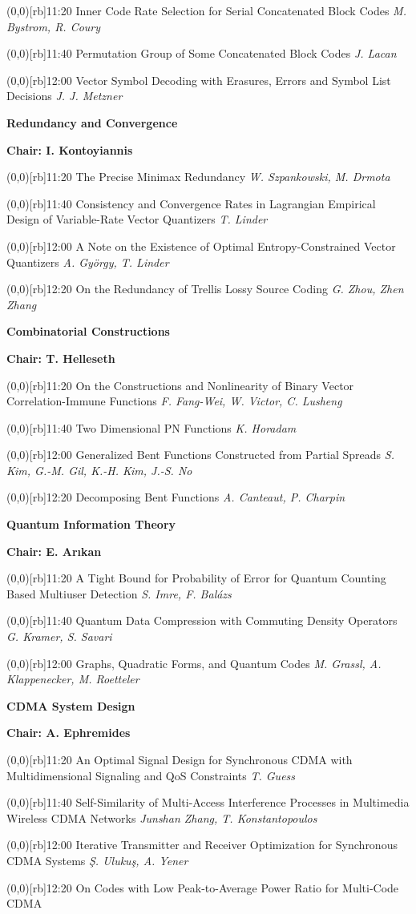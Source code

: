\documentclass[a5paper,twoside]{article}
\def\sesstitle#1{\vspace{.45\bigskipamount}\par{\bfseries #1}\par}
\def\sesschair#1{{\bfseries Chair: #1}\par\vspace{.65\medskipamount}}
\def\papertime#1{\makebox(0,0)[rb]{{\scriptsize #1}\hspace{.5em}}}
\def\papertitle#1{#1\hfil\break}
\def\paperauthors#1{{\itshape #1}\par\filbreak\vspace{.65\medskipamount}}
\begin{document}
\papertime{11:20}%
\papertitle{Inner Code Rate Selection for Serial Concatenated Block Codes}
\paperauthors{M. Bystrom, R. Coury}
\papertime{11:40}%
\papertitle{Permutation Group of Some Concatenated Block Codes}
\paperauthors{J. Lacan}
\papertime{12:00}%
\papertitle{Vector Symbol Decoding with Erasures, Errors and Symbol List Decisions}
\paperauthors{J. J. Metzner}
\sesstitle{Redundancy and Convergence}
\sesschair{I. Kontoyiannis}
\papertime{11:20}%
\papertitle{The Precise Minimax Redundancy}
\paperauthors{W. Szpankowski, M. Drmota}
\papertime{11:40}%
\papertitle{Consistency and Convergence Rates in Lagrangian Empirical Design of Variable-Rate Vector Quantizers}
\paperauthors{T. Linder}
\papertime{12:00}%
\papertitle{A Note on the Existence of Optimal Entropy-Constrained Vector Quantizers}
\paperauthors{A. Gy\"orgy, T. Linder}
\papertime{12:20}%
\papertitle{On the Redundancy of Trellis Lossy Source Coding}
\paperauthors{G. Zhou, Zhen Zhang}
\sesstitle{Combinatorial Constructions}
\sesschair{T. Helleseth}
\papertime{11:20}%
\papertitle{On the Constructions and Nonlinearity of Binary Vector Correlation-Immune Functions}
\paperauthors{F. Fang-Wei, W. Victor, C. Lusheng}
\papertime{11:40}%
\papertitle{Two Dimensional PN Functions}
\paperauthors{K. Horadam}
\papertime{12:00}%
\papertitle{Generalized Bent Functions Constructed from Partial Spreads}
\paperauthors{S. Kim, G.-M. Gil, K.-H. Kim, J.-S. No}
\papertime{12:20}%
\papertitle{Decomposing Bent Functions}
\paperauthors{A. Canteaut, P. Charpin}
\sesstitle{Quantum Information Theory}
\sesschair{E. Ar{\i}kan}
\papertime{11:20}%
\papertitle{A Tight Bound for Probability of Error for Quantum Counting Based Multiuser Detection}
\paperauthors{S. Imre, F. Bal\'azs}
\papertime{11:40}%
\papertitle{Quantum Data Compression with Commuting Density Operators}
\paperauthors{G. Kramer, S. Savari}
\papertime{12:00}%
\papertitle{Graphs, Quadratic Forms, and Quantum Codes}
\paperauthors{M. Grassl, A. Klappenecker, M. Roetteler}
\sesstitle{CDMA System Design}
\sesschair{A. Ephremides}
\papertime{11:20}%
\papertitle{An Optimal Signal Design for Synchronous CDMA with Multidimensional Signaling and QoS Constraints}
\paperauthors{T. Guess}
\papertime{11:40}%
\papertitle{Self-Similarity of Multi-Access Interference Processes in Multimedia Wireless CDMA Networks}
\paperauthors{Junshan Zhang, T. Konstantopoulos}
\papertime{12:00}%
\papertitle{Iterative Transmitter and Receiver Optimization for Synchronous CDMA Systems}
\paperauthors{\c{S}. Uluku\c{s}, A. Yener}
\papertime{12:20}%
\papertitle{On Codes with Low Peak-to-Average Power Ratio for Multi-Code CDMA}
\end{document}
